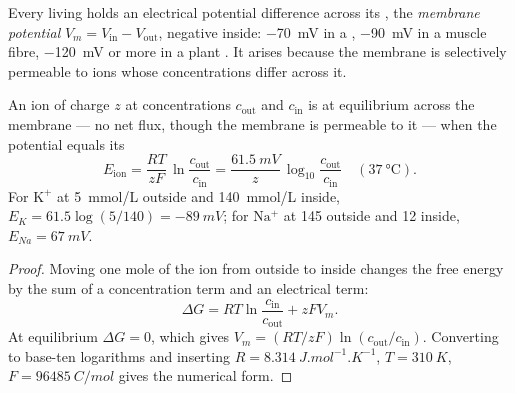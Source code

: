 \begin{definition}\label{def:b1:membranes-transport:potential}
Every living  holds an electrical potential difference across its
, the \emph{membrane potential} $V_m = V_{\text{in}} - V_{\text{out}}$, negative inside:
\qty{-70}{mV} in a , \qty{-90}{mV} in a muscle fibre,
\qty{-120}{mV} or more in a plant . It arises because the membrane
is selectively permeable to ions whose concentrations differ across it.
\end{definition}

\begin{theorem}\label{thm:b1:membranes-transport:nernst}
An ion of charge $z$ at concentrations $c_{\text{out}}$ and
$c_{\text{in}}$ is at equilibrium across the membrane --- no net flux,
though the membrane is permeable to it --- when the potential equals
its \emph{}
\[
E_{\text{ion}} = \frac{RT}{zF}\,\ln\frac{c_{\text{out}}}{c_{\text{in}}}
= \frac{\qty{61.5}{mV}}{z}\,\log_{10}\frac{c_{\text{out}}}{c_{\text{in}}}
\quad (\qty{37}{\celsius}).
\]
For $\mathrm{K^+}$ at \qty{5}{mmol/L} outside and \qty{140}{mmol/L}
inside, $E_K = 61.5\log(5/140) = \qty{-89}{mV}$; for $\mathrm{Na^+}$ at
\qty{145}{} outside and \qty{12}{} inside, $E_{Na} = \qty{+67}{mV}$.
\end{theorem}
\begin{proof}
Moving one mole of the ion from outside to inside changes the free
energy by the sum of a concentration term and an electrical term:
\[
\Delta G = RT\ln\frac{c_{\text{in}}}{c_{\text{out}}} + zFV_m .
\]
At equilibrium $\Delta G = 0$, which gives $V_m = (RT/zF)\ln(c_{\text{out}}/c_{\text{in}})$.
Converting to base-ten logarithms and inserting $R = \qty{8.314}{J.mol^{-1}.K^{-1}}$,
$T = \qty{310}{K}$, $F = \qty{96485}{C/mol}$ gives the numerical form.
\end{proof}

